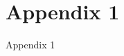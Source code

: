 \documentclass[../../main.tex]{subfiles}
\begin{document}
\chapter[Appendix 1]{Appendix 1}\label{app-A}

Appendix 1
\end{document}
